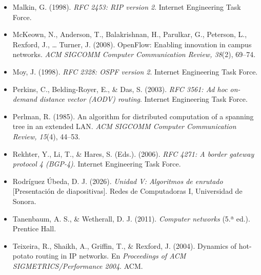 \documentclass[12pt,letterpaper]{article}
\begin{document}
\begin{itemize}[leftmargin=1.5em,itemsep=7pt]
\item[] Malkin, G. (1998). \emph{RFC 2453: RIP version 2}. Internet Engineering Task Force.
\item[] McKeown, N., Anderson, T., Balakrishnan, H., Parulkar, G., Peterson, L., Rexford, J., \ldots{} Turner, J. (2008). OpenFlow: Enabling innovation in campus networks. \emph{ACM SIGCOMM Computer Communication Review, 38}(2), 69--74.
\item[] Moy, J. (1998). \emph{RFC 2328: OSPF version 2}. Internet Engineering Task Force.
\item[] Perkins, C., Belding-Royer, E., \& Das, S. (2003). \emph{RFC 3561: Ad hoc on-demand distance vector (AODV) routing}. Internet Engineering Task Force.
\item[] Perlman, R. (1985). An algorithm for distributed computation of a spanning tree in an extended LAN. \emph{ACM SIGCOMM Computer Communication Review, 15}(4), 44--53.
\item[] Rekhter, Y., Li, T., \& Hares, S. (Eds.). (2006). \emph{RFC 4271: A border gateway protocol 4 (BGP-4)}. Internet Engineering Task Force.
\item[] Rodríguez Úbeda, D. J. (2026). \emph{Unidad V: Algoritmos de enrutado} [Presentación de diapositivas]. Redes de Computadoras I, Universidad de Sonora.
\item[] Tanenbaum, A. S., \& Wetherall, D. J. (2011). \emph{Computer networks} (5.ª ed.). Prentice Hall.
\item[] Teixeira, R., Shaikh, A., Griffin, T., \& Rexford, J. (2004). Dynamics of hot-potato routing in IP networks. En \emph{Proceedings of ACM SIGMETRICS/Performance 2004}. ACM.
\end{itemize}
\end{document}
